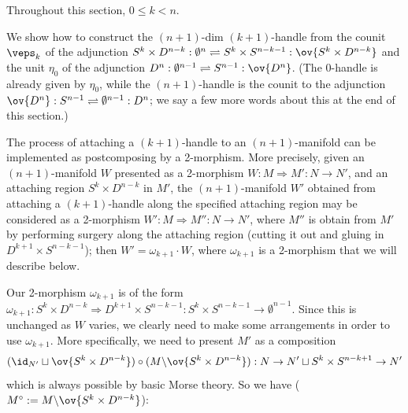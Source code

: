 \documentclass[12pt]{article}
\newcommand{\disk}[1]{{D^{#1}}}
\newcommand{\sphr}[1]{{S^{#1}}}
\newcommand{\empt}[1]{{\emptyset^{#1}}}
\begin{document}
Throughout this section, $0 \leq k < n$.

We show how to construct the $(n+1)$-dim $(k+1)$-handle
from the counit $\veps_k$ of the adjunction
$\sphr{k} \times \disk{n-k} : \empt{n} \rightleftharpoons
	\sphr{k} \times \sphr{n-k-1} : \ov{\sphr{k} \times \disk{n-k}}$
and the unit $\eta_0$ of the adjunction
$\disk{n} : \empt{n-1} \rightleftharpoons
	\sphr{n-1}: \ov{\disk{n}}$.
(The 0-handle is already given by $\eta_0$,
while the $(n+1)$-handle is the counit to the adjunction
$\ov{\disk{n}} : \sphr{n-1} \rightleftharpoons
	\empt{n-1}: \disk{n}$;
we say a few more words about this at the end of this section.)


The process of attaching a $(k+1)$-handle to an $(n+1)$-manifold
can be implemented as postcomposing by a 2-morphism.
More precisely, given an $(n+1)$-manifold $W$
presented as a 2-morphism $W: M \Rightarrow M' : N \to N'$,
and an attaching region $\sphr{k} \times \disk{n-k}$ in $M'$,
the $(n+1)$-manifold $W'$ obtained from
attaching a $(k+1)$-handle along the specified attaching region
may be considered as a 2-morphism
$W': M \Rightarrow M'': N \to N'$,
where $M''$ is obtain from $M'$ by performing surgery
along the attaching region
(cutting it out and gluing in $\disk{k+1} \times \sphr{n-k-1}$);
then $W' = \omega_{k+1} \cdot W$,
where $\omega_{k+1}$ is a 2-morphism that we will describe below.


Our 2-morphism $\omega_{k+1}$ is of the form
$\omega_{k+1}: \sphr{k} \times \disk{n-k}
	\Rightarrow \disk{k+1} \times \sphr{n-k-1} :
	\sphr{k} \times \sphr{n-k-1} \to \empt{n-1}$.
Since this is unchanged as $W$ varies,
we clearly need to make some arrangements
in order to use $\omega_{k+1}$.
More specifically,
we need to present $M'$ as a composition
\[
(\id_{N'} \sqcup \ov{\sphr{k} \times \disk{n-k}})
\circ (M \backslash \ov{\sphr{k} \times \disk{n-k}}) :
N \to N' \sqcup \sphr{k} \times \sphr{n-k+1} \to N'
\]
which is always possible by basic Morse theory.
So we have
($M^\circ := M \backslash \ov{\sphr{k} \times \disk{n-k}}$):

\end{document}

